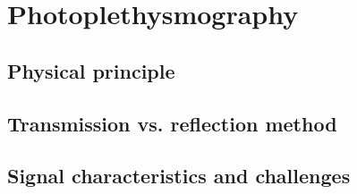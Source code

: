 
\chapter{Photoplethysmography}
\label{cha:Photoplethysmography}

\section{Physical principle}
\label{sec:Physical principle}

\section{Transmission vs. reflection method}
\label{sec:Transmission vs. reflection method}

\section{Signal characteristics and challenges}
\label{sec:Signal characteristics and challenges}